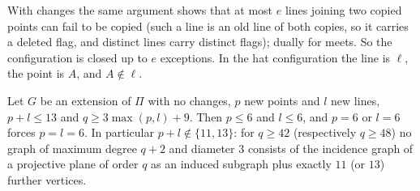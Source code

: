 With changes the same argument shows that at most $e$ lines joining two copied points can fail to be copied (such a
line is an old line of both copies, so it carries a deleted flag, and distinct lines carry distinct flags); dually for
meets. So the configuration is closed up to $e$ exceptions. In the hat configuration the line is $\ell$, the point is
$A$, and $A \notin \ell$.

\begin{theorem}\label{thm:nochange}
Let $G$ be an extension of $\Pi$ with no changes, $p$ new points and $l$ new lines, $p + l \le 13$ and
$q \ge 3\max(p,l)+9$. Then $p \le 6$ and $l \le 6$, and $p = 6$ or $l = 6$ forces $p = l = 6$.
In particular $p + l \notin \{11, 13\}$: for $q \ge 42$ (respectively $q \ge 48$) no graph of maximum degree $q+2$
and diameter $3$ consists of the incidence graph of a projective plane of order $q$ as an induced subgraph plus exactly
$11$ (or $13$) further vertices.
\end{theorem}
